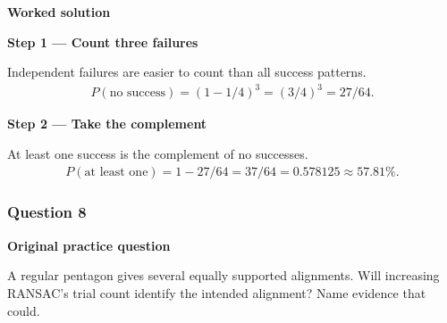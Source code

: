 \documentclass[letterpaper,11pt,english,openany,oneside]{jupyterBook}
\begin{document}
\par\medskip

\par\medskip
\textbf{Worked solution}\par\smallskip

\par\medskip{}
{\color{QuizStepRed}\bfseries Step 1 — Count three failures}\par\smallskip

\sphinxAtStartPar
{} Independent failures are easier to count than all success patterns.
{\color{QuizMathBlue} \begin{equation*}
\begin{split}
P(\text{no success})=(1-1/4)^3=(3/4)^3=27/64.
\end{split}
\end{equation*}}
\par

\par\medskip{}
{\color{QuizStepRed}\bfseries Step 2 — Take the complement}\par\smallskip

\sphinxAtStartPar
{} At least one success is the complement of no successes.
{\color{QuizMathBlue} \begin{equation*}
\begin{split}
P(\text{at least one})=1-27/64=37/64=0.578125\approx57.81\%.
\end{split}
\end{equation*}}
\par

\par\medskip


\subsubsection{Question 8}
\label{\detokenize{lectures/lecture03/tldr:question-8}}\label{\detokenize{lectures/lecture03/tldr:lec03-tldr-q8}}
\par\medskip\textbf{Original practice question}\par\smallskip

\sphinxAtStartPar
A regular pentagon gives several equally supported alignments. Will increasing RANSAC’s trial count identify the intended alignment? Name evidence that could.

\par\medskip
\end{document}
